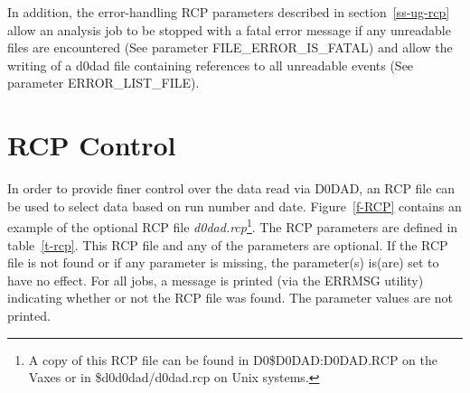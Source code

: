 \par
In addition, the error-handling RCP parameters 
described in section~\ref{ss-ug-rcp} allow an analysis job to be stopped with 
a fatal error message if any unreadable files are encountered 
(See parameter FILE\_ERROR\_IS\_FATAL)
and allow the writing of a d0dad file containing references to all unreadable 
events (See parameter ERROR\_LIST\_FILE).

\section{RCP Control \label{ss-ug-rcp}}
\par
In order to provide finer control over the data read via D0DAD, an RCP file
can be used to select data based on run number and date.
Figure~\ref{f-RCP} contains an 
example of the optional RCP file {\em d0dad.rcp}\footnote{A copy of this RCP
file can be found in D0\$D0DAD:D0DAD.RCP on the Vaxes or in \$d0d0dad/d0dad.rcp
on Unix systems.}.  The RCP parameters are defined in table~\ref{t-rcp}.
This RCP file and any of the parameters are optional.  If the RCP file is not
found or if any parameter is missing, the parameter(s) is(are) set to have no 
effect.  For all jobs, a message is printed (via the ERRMSG utility) indicating
whether or not the RCP file was found.  The parameter values are not printed.
